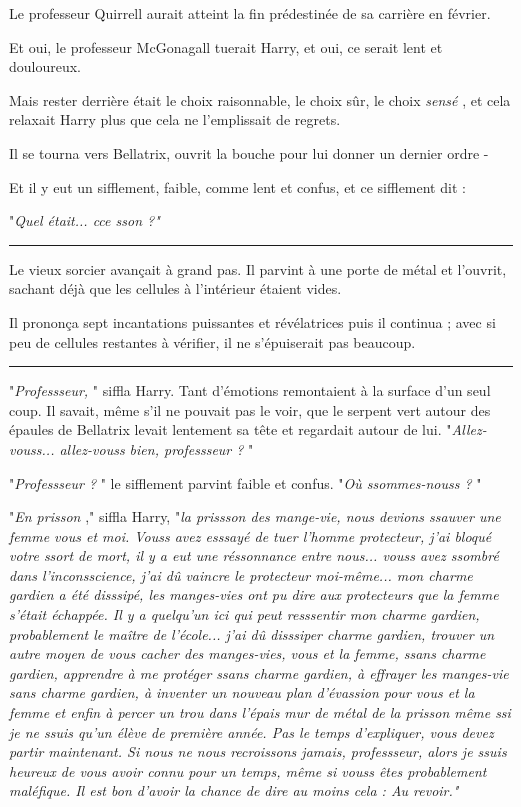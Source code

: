 Le professeur Quirrell aurait atteint la fin prédestinée de sa carrière en février.

Et oui, le professeur McGonagall tuerait Harry, et oui, ce serait lent et douloureux.

Mais rester derrière était le choix raisonnable, le choix sûr, le choix \emph{sensé} , et cela relaxait Harry plus que cela ne l'emplissait de regrets.

Il se tourna vers Bellatrix, ouvrit la bouche pour lui donner un dernier ordre -

Et il y eut un sifflement, faible, comme lent et confus, et ce sifflement dit :

"\emph{Quel était... cce sson ?"} 
\par\noindent\rule{\textwidth}{0.4pt}
Le vieux sorcier avançait à grand pas. Il parvint à une porte de métal et l'ouvrit, sachant déjà que les cellules à l'intérieur étaient vides.

Il prononça sept incantations puissantes et révélatrices puis il continua ; avec si peu de cellules restantes à vérifier, il ne s'épuiserait pas beaucoup.
\par\noindent\rule{\textwidth}{0.4pt}
"\emph{Professseur,} " siffla Harry. Tant d'émotions remontaient à la surface d'un seul coup. Il savait, même s'il ne pouvait pas le voir, que le serpent vert autour des épaules de Bellatrix levait lentement sa tête et regardait autour de lui. "\emph{Allez-vouss... allez-vouss bien, professseur ?} "

"\emph{Professseur ?} " le sifflement parvint faible et confus. "\emph{Où ssommes-nouss ?} "

"\emph{En prisson} ," siffla Harry, "\emph{la prissson des mange-vie, nous devions ssauver une femme vous et moi. Vouss avez esssayé de tuer l'homme protecteur, j'ai bloqué votre ssort de mort, il y a eut une réssonnance entre nous... vouss avez ssombré dans l'inconsscience, j'ai dû vaincre le protecteur moi-même... mon charme gardien a été disssipé, les manges-vies ont pu dire aux protecteurs que la femme s'était échappée. Il y a quelqu'un ici qui peut resssentir mon charme gardien, probablement le maître de l'école... j'ai dû disssiper charme gardien, trouver un autre moyen de vous cacher des manges-vies, vous et la femme, ssans charme gardien, apprendre à me protéger ssans charme gardien, à effrayer les manges-vie sans charme gardien, à inventer un nouveau plan d'évassion pour vous et la femme et enfin à percer un trou dans l'épais mur de métal de la prisson même ssi je ne ssuis qu'un élève de première année. Pas le temps d'expliquer, vous devez partir maintenant. Si nous ne nous recroissons jamais, professseur, alors je ssuis heureux de vous avoir connu pour un temps, même si vouss êtes probablement maléfique. Il est bon d'avoir la chance de dire au moins cela : Au revoir."} 

